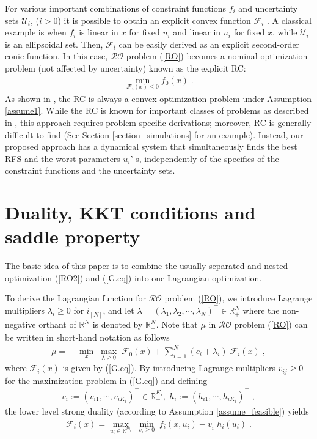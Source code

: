 \documentclass[journal,twoside,web]{ieeecolor}
\begin{document}
For various important combinations of constraint functions $f_i$ and uncertainty sets $\mathcal{U}_i$, ($i>0$) it is possible to obtain an explicit convex function $\mathcal{F}_i$ \cite{bental2009}. A classical example is when $f_i$ is linear in $x$ for fixed $u_i$ and linear in $u_i$ for fixed $x$, while $\mathcal{U}_i$ is an ellipsoidal set.
Then, $\mathcal{F}_i$ can be easily derived as an explicit second-order conic function.
In this case, $\mathcal{RO}$ problem (\ref{RO}) becomes a nominal optimization problem (not affected by uncertainty) known as the explicit RC:
\begin{align} \label{rc}
\displaystyle \min_{\mathcal{F}_i(x)\leq 0} f_0(x)\;.
\end{align}
As shown in \cite{bental2009-2}, the RC is always a convex optimization problem under Assumption \ref{assume1}. While the RC is known for important classes of problems as described in \cite{bertsimas2011}, this approach requires problem-specific derivations; moreover, RC is generally difficult to find (See Section \ref{section_simulations} for an example). Instead, our proposed approach has a dynamical system that simultaneously finds the best RFS and the worst parameters $u_i$' s, independently of the specifics of the constraint functions and the uncertainty sets.


\section{Duality, KKT conditions and saddle property} \label{section_saddle}
The basic idea of this paper is to combine the usually separated and nested optimization (\ref{RO2}) and (\ref{G.eq}) into one Lagrangian optimization.

To derive the Lagrangian function for $\mathcal{RO}$ problem (\ref{RO}), we introduce Lagrange multipliers $\lambda_i\geq 0$ for $i^+_{[N]}$, and let $\lambda=(\lambda_1,\lambda_2,\cdots,\lambda_N)^\top \in \mathbb{R}_+^N$ where the non-negative orthant of $\mathbb{R}^N$ is denoted by $\mathbb{R}_+^N$. Note that $\mu$ in $\mathcal{RO}$ problem (\ref{RO}) can be written in short-hand notation  as follows
\begin{align}
\mu=&\;\underset{x}{\min}\;\underset{\lambda\geq 0}{\max}\; \mathcal{F}_0(x)+\sum_{i=1}^N (c_i+\lambda_i) \; \mathcal{F}_i(x)\;,
 \label{upper_ro}
\end{align}
where $\mathcal{F}_i(x)$ is given by (\ref{G.eq}).
 By introducing Lagrange multipliers $v_{ij} \geq 0$ for the maximization problem in (\ref{G.eq}) and defining
\begin{align*}
v_i:=(v_{i1},\cdots, v_{iK_i})^\top \in \mathbb{R}_+^{K_i},\;h_i:=(h_{i1},\cdots, h_{iK_i})^\top\;,\nonumber
\end{align*}
the lower level strong duality (according to Assumption \ref{assume_feasible}) yields
\begin{align} \label{lower_ro}
\mathcal{F}_i(x)=\underset{u_i\in \mathbb{R}^{m_i}}{\max}\;\underset{v_{i}\geq 0}{\min}\;f_i(x,u_i)-v_i^\top h_{i}(u_i)\;.
\end{align}
\end{document}
